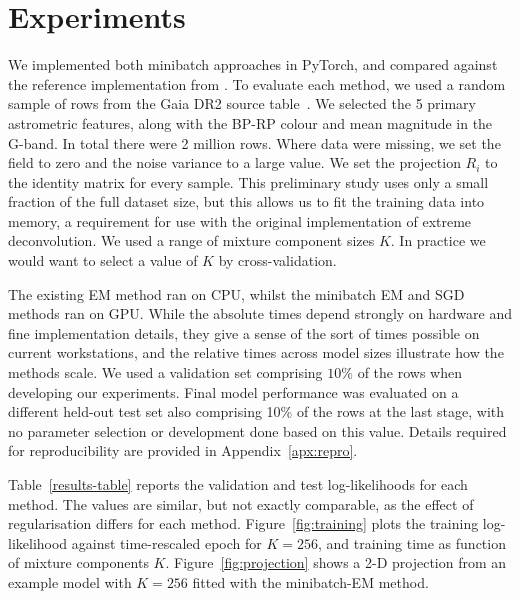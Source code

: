 \documentclass{article}
\begin{document}
\section{Experiments}
\label{sec:experiments}

We implemented both minibatch approaches in PyTorch, and compared against the reference implementation from \citet{bovyExtremeDeconvolutionInferring2011}.
To evaluate each method, we used a random sample of rows from the Gaia DR2 source table~\cite{brownGaiaDataRelease2018}.
We selected the 5 primary astrometric features, along with the BP-RP colour and mean magnitude in the G-band.
In total there were 2 million rows.
Where data were missing, we set the field to zero and the noise variance to a large value.
We set the projection $R_i$ to the identity matrix for every sample.
This preliminary study uses only a small fraction of the full dataset size, but this allows us to fit the training data into memory, a requirement for use with the original implementation of extreme deconvolution.
We used a range of mixture component sizes $K$.
In practice we would want to select a value of $K$ by cross-validation.

The existing EM method ran on CPU, whilst the minibatch EM and SGD methods ran on GPU\@.
While the absolute times depend strongly on hardware and fine implementation details, they give a sense of the sort of times possible on current workstations, and the relative times across model sizes illustrate how the methods scale.
We used a validation set comprising $10\%$ of the rows when developing our experiments.
Final model performance was evaluated on a different held-out test set also comprising 10\% of the rows at the last stage, with no parameter selection or development done based on this value.
Details required for reproducibility are provided in Appendix~\ref{apx:repro}.

Table~\ref{results-table} reports the validation and test log-likelihoods for each method.
The values are similar, but not exactly comparable, as the effect of regularisation differs for each method.
Figure~\ref{fig:training} plots the training log-likelihood against time-rescaled epoch for $K=256$, and training time as function of mixture components $K$.
Figure~\ref{fig:projection} shows a 2-D projection from an example model with $K=256$ fitted with the minibatch-EM method.
\end{document}
